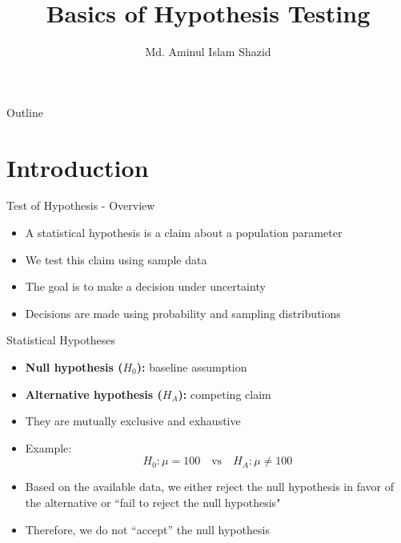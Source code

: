 \documentclass[12pt, aspectratio=169]{beamer}
\title{Basics of Hypothesis Testing}
\author{Md. Aminul Islam Shazid}
\date{}
\begin{document}
    {
		\addtocounter{framenumber}{-2}

		\begin{frame}
			\titlepage
		\end{frame}

		\begin{frame}{Outline}
            \vfill
			\tableofcontents[subsectionstyle=hide]
            \vfill
		\end{frame}
	}

    \section{Introduction}


    \begin{frame}{Test of Hypothesis - Overview}
        \begin{itemize}
            \item A statistical hypothesis is a claim about a population parameter
            \item We test this claim using sample data
            \item The goal is to make a decision under uncertainty
            \item Decisions are made using probability and sampling distributions
        \end{itemize}
    \end{frame}


    \begin{frame}{Statistical Hypotheses}
        \begin{itemize}
            \item \textbf{Null hypothesis ($H_0$):} baseline assumption
            \item \textbf{Alternative hypothesis ($H_A$):} competing claim
            \item They are mutually exclusive and exhaustive
            \item Example:
            \[
            H_0: \mu = 100 \quad \text{vs} \quad H_A: \mu \neq 100
            \]
            \item Based on the available data, we either reject the null hypothesis in favor of the alternative or ``fail to reject the null hypothesis"
            \item Therefore, we do not ``accept'' the null hypothesis
        \end{itemize}
    \end{frame}
\end{document}
